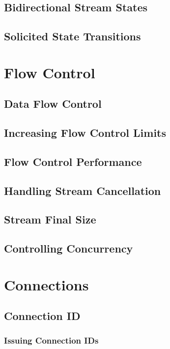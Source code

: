 \documentclass{article}
\begin{document}
\subsection{Bidirectional Stream States}

\subsection{Solicited State Transitions}

\section{Flow Control}

\subsection{Data Flow Control}

\subsection{Increasing Flow Control Limits}

\subsection{Flow Control Performance}

\subsection{Handling Stream Cancellation}

\subsection{Stream Final Size}

\subsection{Controlling Concurrency}

\section{Connections}

\subsection{Connection ID}

\subsubsection{Issuing Connection IDs}
\end{document}
